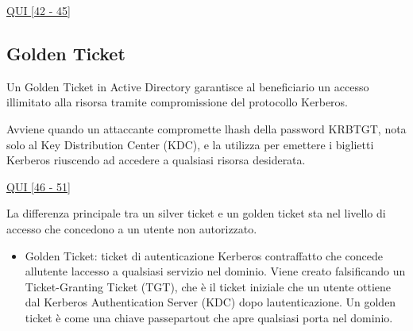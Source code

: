 \documentclass[
]{article}
\providecommand{\tightlist}{%
  \setlength{\itemsep}{0pt}\setlength{\parskip}{0pt}}
\begin{document}
{}

{\href{https://www.google.com/url?q=https://virtuale.unibo.it/pluginfile.php/2023963/mod_resource/content/1/Laboratorio\%2520di\%2520sicurezza\%2520dei\%2520sistemi\%2520informatici\%2520e\%2520privacy\%2520-\%252002\%2520Active\%2520Directory\%2520Security\%2520-\%2520V1R0.pdf&sa=D&source=editors&ust=1734628852100089&usg=AOvVaw2uFr1HvAavHHCWtBTru8Pu}{QUI
{[}42 - 45{]}}}

\subsection{\texorpdfstring{{Golden
Ticket}}{Golden Ticket}}\label{h.4war67e8lxp9}

{Un Golden Ticket in Active Directory garantisce al beneficiario un
accesso illimitato alla risorsa tramite compromissione del protocollo
Kerberos.}

{}

{Avviene quando un attaccante compromette l\textquotesingle hash della
password KRBTGT, nota solo al Key Distribution Center (KDC), e la
utilizza per emettere i biglietti Kerberos riuscendo ad accedere a
qualsiasi risorsa desiderata.}

{}

{\href{https://www.google.com/url?q=https://virtuale.unibo.it/pluginfile.php/2023963/mod_resource/content/1/Laboratorio\%2520di\%2520sicurezza\%2520dei\%2520sistemi\%2520informatici\%2520e\%2520privacy\%2520-\%252002\%2520Active\%2520Directory\%2520Security\%2520-\%2520V1R0.pdf&sa=D&source=editors&ust=1734628852100528&usg=AOvVaw3wfNTIGS7jZbAknvTFwWZT}{QUI
{[}46 - 51{]}}}

{}

{La differenza principale tra un silver ticket e un golden ticket sta
nel livello di accesso che concedono a un utente non autorizzato.}

\begin{itemize}
\tightlist
\item
  {Golden Ticket}{: ticket di autenticazione Kerberos contraffatto che
  concede all\textquotesingle utente l\textquotesingle{}}{accesso a
  qualsiasi servizio nel dominio}{. Viene creato falsificando un
  Ticket-Granting Ticket (TGT), che è il ticket iniziale che un utente
  ottiene dal Kerberos Authentication Server (KDC) dopo
  l\textquotesingle autenticazione. Un golden ticket è come una chiave
  passepartout che apre qualsiasi porta nel dominio.}
\end{itemize}

{}
\end{document}
